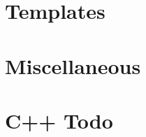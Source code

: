 \documentclass[12pt]{muthesis}
\begin{document}
\chapter{Templates \label{chap:cpptemplates}}



\chapter{Miscellaneous \label{chap:cppmiscellaneous}}


\chapter{C++ Todo \label{chap:cpptodo}}


%

%

%


%


%
\end{document}
